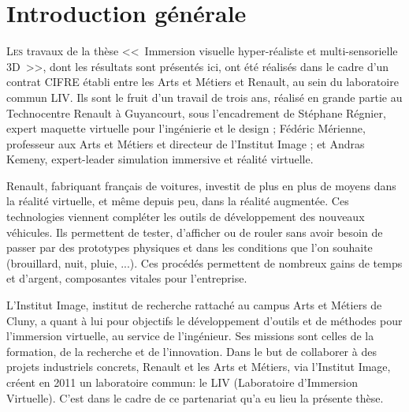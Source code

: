 \chapter*{Introduction générale}

\lettrine[lines=3]{L}{es} travaux de la thèse <<~Immersion visuelle hyper-réaliste et multi-sensorielle 3D~>>, dont les résultats sont présentés ici, ont été réalisés dans le cadre d’un contrat CIFRE établi entre les Arts et Métiers et Renault, au sein du laboratoire commun LIV. Ils sont le fruit d'un travail de trois ans, réalisé en grande partie au Technocentre Renault à Guyancourt, sous l'encadrement de Stéphane Régnier, expert maquette virtuelle pour l'ingénierie et le design ; Fédéric Mérienne, professeur aux Arts et Métiers et directeur de l'Institut Image ; et Andras Kemeny, expert-leader simulation immersive et réalité virtuelle.

\par Renault, fabriquant français de voitures, investit de plus en plus de moyens dans la réalité virtuelle, et même depuis peu, dans la réalité augmentée. Ces technologies viennent compléter les outils de développement des nouveaux véhicules. Ils permettent de tester, d'afficher ou de rouler sans avoir besoin de passer par des prototypes physiques et dans les conditions que l'on souhaite (brouillard, nuit, pluie, ...). Ces procédés permettent de nombreux gains de temps et d'argent, composantes vitales pour l'entreprise.

\par L'Institut Image, institut de recherche rattaché au campus Arts et Métiers de Cluny, a quant à lui pour objectifs le développement d'outils et de méthodes pour l'immersion virtuelle, au service de l'ingénieur. Ses missions sont celles de la formation, de la recherche et de l'innovation. Dans le but de collaborer à des projets industriels concrets, Renault et les Arts et Métiers, via l'Institut Image, créent en 2011 un laboratoire commun: le LIV (Laboratoire d'Immersion Virtuelle). C'est dans le cadre de ce partenariat qu'a eu lieu la présente thèse.

